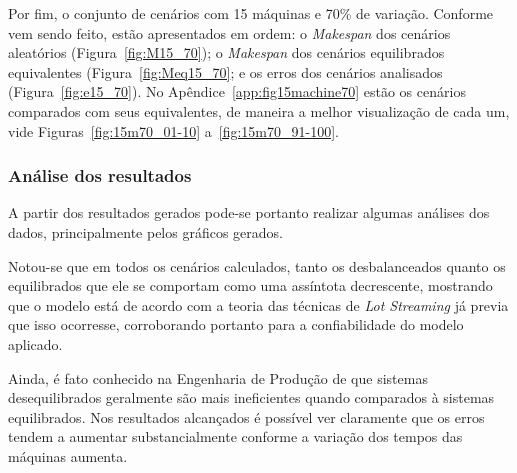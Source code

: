     
    
    
    
    
    
    Por fim, o conjunto de cenários com 15 máquinas e 70\% de variação. Conforme vem sendo feito, estão apresentados em ordem: o \textit{Makespan} dos cenários aleatórios (Figura~\ref{fig:M15_70}); o \textit{Makespan} dos cenários equilibrados equivalentes (Figura~\ref{fig:Meq15_70}; e os erros dos cenários analisados (Figura~\ref{fig:e15_70}). No Apêndice~\ref{app:fig15machine70} estão os cenários comparados com seus equivalentes, de maneira a melhor visualização de cada um, vide Figuras~\ref{fig:15m70_01-10} a~\ref{fig:15m70_91-100}.
    
    
    
    
    
    
    
    \subsubsection{Análise dos resultados}
    
    A partir dos resultados gerados pode-se portanto realizar algumas análises dos dados, principalmente pelos gráficos gerados. 
    
    Notou-se que em todos os cenários calculados, tanto os desbalanceados quanto os equilibrados que ele se comportam como uma assíntota decrescente, mostrando que o modelo está de acordo com a teoria das técnicas de \textit{Lot Streaming} já previa que isso ocorresse, corroborando portanto para a confiabilidade do modelo aplicado. 
    
    Ainda, é fato conhecido na Engenharia de Produção de que sistemas desequilibrados geralmente são mais ineficientes quando comparados à sistemas equilibrados. Nos resultados alcançados é possível ver claramente que os erros tendem a aumentar substancialmente conforme a variação dos tempos das máquinas aumenta. 
    
